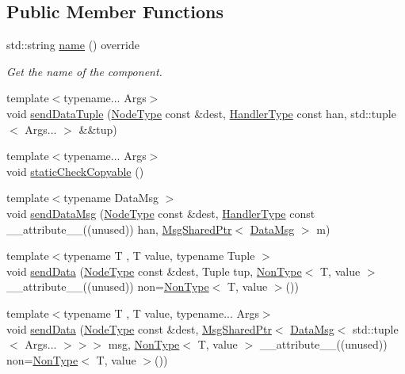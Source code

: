 \subsection*{Public Member Functions}
\begin{DoxyCompactItemize}
\item 
std\+::string \hyperlink{structvt_1_1param_1_1_param_a848380f8509c11b8bffcf0724af77127}{name} () override
\begin{DoxyCompactList}\small\item\em Get the name of the component. \end{DoxyCompactList}\item 
{\footnotesize template$<$typename... Args$>$ }\\void \hyperlink{structvt_1_1param_1_1_param_adf25c8f5db146087b244ab244f874000}{send\+Data\+Tuple} (\hyperlink{namespacevt_a866da9d0efc19c0a1ce79e9e492f47e2}{Node\+Type} const \&dest, \hyperlink{namespacevt_af64846b57dfcaf104da3ef6967917573}{Handler\+Type} const han, std\+::tuple$<$ Args... $>$ \&\&tup)
\item 
{\footnotesize template$<$typename... Args$>$ }\\void \hyperlink{structvt_1_1param_1_1_param_a8d670f74eb5f0a1b5ea312e8b174b648}{static\+Check\+Copyable} ()
\item 
{\footnotesize template$<$typename Data\+Msg $>$ }\\void \hyperlink{structvt_1_1param_1_1_param_a5a4f7cdd18507a9012936f138397d075}{send\+Data\+Msg} (\hyperlink{namespacevt_a866da9d0efc19c0a1ce79e9e492f47e2}{Node\+Type} const \&dest, \hyperlink{namespacevt_af64846b57dfcaf104da3ef6967917573}{Handler\+Type} const \+\_\+\+\_\+attribute\+\_\+\+\_\+((unused)) han, \hyperlink{namespacevt_ab2b3d506ec8e8d1540aede826d84a239}{Msg\+Shared\+Ptr}$<$ \hyperlink{structvt_1_1param_1_1_data_msg}{Data\+Msg} $>$ m)
\item 
{\footnotesize template$<$typename T , T value, typename Tuple $>$ }\\void \hyperlink{structvt_1_1param_1_1_param_a6b2fedacd76ee622efdb14038b0d82fe}{send\+Data} (\hyperlink{namespacevt_a866da9d0efc19c0a1ce79e9e492f47e2}{Node\+Type} const \&dest, Tuple tup, \hyperlink{structvt_1_1param_1_1_non_type}{Non\+Type}$<$ T, value $>$ \+\_\+\+\_\+attribute\+\_\+\+\_\+((unused)) non=\hyperlink{structvt_1_1param_1_1_non_type}{Non\+Type}$<$ T, value $>$())
\item 
{\footnotesize template$<$typename T , T value, typename... Args$>$ }\\void \hyperlink{structvt_1_1param_1_1_param_af0791eb37c18d175bdcce5e2f2384427}{send\+Data} (\hyperlink{namespacevt_a866da9d0efc19c0a1ce79e9e492f47e2}{Node\+Type} const \&dest, \hyperlink{namespacevt_ab2b3d506ec8e8d1540aede826d84a239}{Msg\+Shared\+Ptr}$<$ \hyperlink{structvt_1_1param_1_1_data_msg}{Data\+Msg}$<$ std\+::tuple$<$ Args... $>$$>$$>$ msg, \hyperlink{structvt_1_1param_1_1_non_type}{Non\+Type}$<$ T, value $>$ \+\_\+\+\_\+attribute\+\_\+\+\_\+((unused)) non=\hyperlink{structvt_1_1param_1_1_non_type}{Non\+Type}$<$ T, value $>$())

\end{DoxyCompactItemize}
